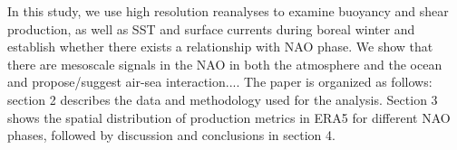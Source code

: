 In this study, we use high resolution reanalyses to examine buoyancy and shear production, as well as SST and surface currents during boreal winter and establish whether there exists a relationship with NAO phase. We show that there are mesoscale signals in the NAO in both the atmosphere and the ocean and propose/suggest air-sea interaction.... The paper is organized as follows: section 2 describes the data and methodology used for the analysis. Section 3 shows the spatial distribution of production metrics in ERA5 for different NAO phases, followed by discussion and conclusions in section 4.










